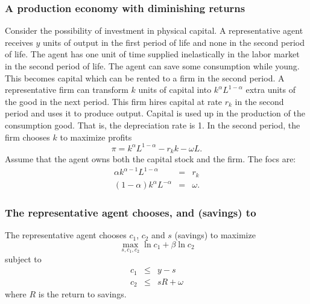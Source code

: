 \documentclass[aspectratio=169]{ltx-talk}
\begin{document}
\begin{frame}
\frametitle{A production economy with diminishing returns}
Consider the possibility of investment in physical capital. A representative
agent receives $y$ units of output in the first period of life and none in
the second period of life. The agent has one unit of time supplied
inelastically in the labor market in the second period of life. The agent
can save some consumption while young. This becomes capital which can be
rented to a firm in the second period. A representative firm can transform $%
k $ units of capital into $k^{\alpha }L^{1-\alpha }$ extra units of the good
in the next period. This firm hires capital at rate $r_{k}$ in the second
period and uses it to produce output. Capital is used up in the production
of the consumption good. That is, the depreciation rate is 1. In the second
period, the firm chooses $k$ to maximize profits%
\begin{equation*}
\pi =k^{\alpha }L^{1-\alpha }-r_{k}k-\omega L.
\end{equation*}%
Assume that the agent owns both the capital stock and the firm. The focs are:%
\begin{eqnarray*}
\alpha k^{\alpha -1}L^{1-\alpha } &=&r_{k} \\
\left( 1-\alpha \right) k^{\alpha }L^{-\alpha } &=&\omega .
\end{eqnarray*}%
\end{frame}

\begin{frame}
\frametitle{The representative agent chooses, and (savings) to}
The representative agent chooses $c_{1}$, $c_{2}$ and $s$ (savings) to
maximize 
\begin{equation*}
\underset{s,c_{1},c_{2}}{\max }\ln c_{1}+\beta \ln c_{2}
\end{equation*}%
subject to 
\begin{eqnarray*}
c_{1} &\leq &y-s \\
c_{2} &\leq &sR+\omega
\end{eqnarray*}%
where $R$ is the return to savings.
\end{frame}
\end{document}
